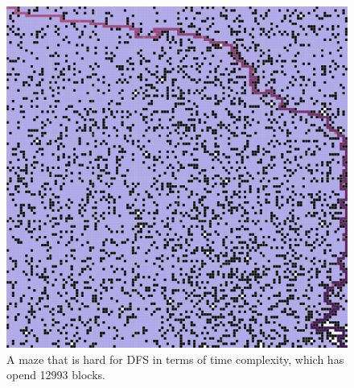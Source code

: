 \documentclass[letter]{article}
\begin{document}
\begin{enumerate}[resume]
\begin{enumerate}
\begin{enumerate}
\begin{figure}
					\includegraphics[width=\textwidth]{../pics/db/12993.png}
					\caption{\label{fig:db1}A maze that is hard for DFS in terms of time complexity, which has opend 12993 blocks.}
					

\end{figure}
\end{enumerate}
\end{enumerate}
\end{enumerate}
\end{document}
